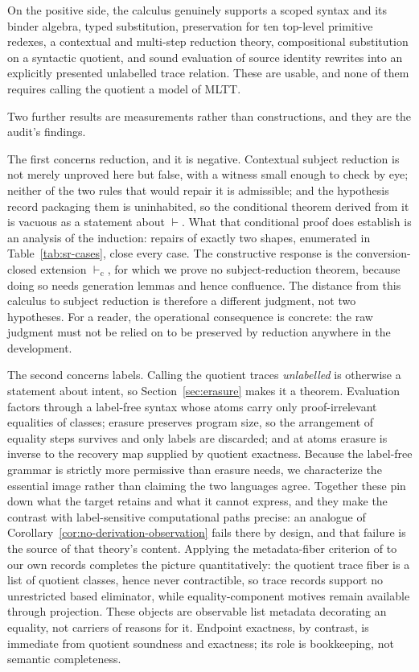 \documentclass[10pt,reqno]{amsart}
\newcommand{\vdashC}{\vdash_{\mathrm{c}}}
\begin{document}
On the positive side, the calculus genuinely supports a scoped syntax and its
binder algebra, typed substitution, preservation for ten top-level primitive
redexes, a contextual and multi-step reduction theory, compositional
substitution on a syntactic quotient, and sound evaluation of source identity
rewrites into an explicitly presented unlabelled trace relation.  These are
usable, and none of them requires calling the quotient a model of MLTT.

Two further results are measurements rather than constructions, and they are the
audit's findings.

The first concerns reduction, and it is negative.  Contextual subject reduction
is not merely unproved here but false, with a witness small enough to check by
eye; neither of the two rules that would repair it is admissible; and the
hypothesis record packaging them is uninhabited, so the conditional theorem
derived from it is vacuous as a statement about \(\vdash\).  What that
conditional proof does establish is an analysis of the induction: repairs of
exactly two shapes, enumerated in Table~\ref{tab:sr-cases}, close every case.
The constructive response is the conversion-closed extension \(\vdashC\), for
which we prove no subject-reduction theorem, because doing so needs generation
lemmas and hence confluence.  The distance from this calculus to subject
reduction is therefore a different judgment, not two hypotheses.  For a reader,
the operational consequence is concrete: the raw judgment must not be relied on
to be preserved by reduction anywhere in the development.

The second concerns labels.  Calling the quotient traces \emph{unlabelled} is
otherwise a statement about intent, so Section~\ref{sec:erasure} makes it a
theorem.  Evaluation factors through a label-free syntax whose atoms carry only
proof-irrelevant equalities of classes; erasure preserves program size, so the
arrangement of equality steps survives and only labels are discarded; and at
atoms erasure is inverse to the recovery map supplied by quotient exactness.
Because the label-free grammar is strictly more permissive than erasure needs,
we characterize the essential image rather than claiming the two languages
agree.  Together these pin down what the target retains and what it cannot
express, and they make the contrast with label-sensitive computational paths
precise: an analogue of Corollary~\ref{cor:no-derivation-observation} fails
there by design, and that failure is the source of that theory's content.
Applying the metadata-fiber criterion of \cite{ObservableMetadata2026} to our
own records completes the picture quantitatively: the quotient trace fiber is a
list of quotient classes, hence never contractible, so trace records support no
unrestricted based eliminator, while equality-component motives remain available
through projection.  These objects are observable list metadata decorating an
equality, not carriers of reasons for it.  Endpoint exactness, by contrast, is
immediate from quotient soundness and exactness; its role is bookkeeping, not
semantic completeness.
\end{document}
